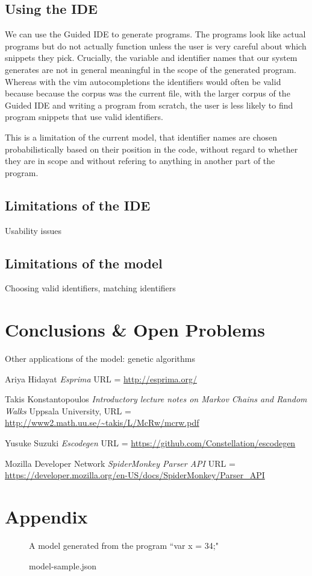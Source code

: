 \documentclass{article}
\begin{document}
\subsection{Using the IDE}

We can use the Guided IDE to generate programs. The programs look like actual
programs but do not actually function unless the user is very careful about
which snippets they pick. Crucially, the variable and identifier names that our
system generates are not in general meaningful in the scope of the generated
program.  Whereas with the vim autocompletions the identifiers would often be
valid because because the corpus was the current file, with the larger corpus of
the Guided IDE and writing a program from scratch, the user is less likely to
find program snippets that use valid identifiers.

This is a limitation of the current model, that identifier names are chosen
probabilistically based on their position in the code, without regard to whether
they are in scope and without refering to anything in another part of the
program.

\subsection{Limitations of the IDE}

Usability issues

\subsection{Limitations of the model}

Choosing valid identifiers, matching identifiers

\section{Conclusions \& Open Problems}

Other applications of the model: genetic algorithms

\clearpage
\begin{thebibliography}{1}

	 Ariya Hidayat {\em Esprima}
		URL = \url{http://esprima.org/}

	 Takis Konstantopoulos {\em Introductory lecture notes on
		Markov Chains and Random Walks} Uppsala University,
		URL = \url{http://www2.math.uu.se/~takis/L/McRw/mcrw.pdf}

	 Yusuke Suzuki {\em Escodegen}
		URL = \url{https://github.com/Constellation/escodegen}

	 Mozilla Developer Network {\em SpiderMonkey Parser API}
		URL = \url{https://developer.mozilla.org/en-US/docs/SpiderMonkey/Parser_API}

\end{thebibliography}

\clearpage
\section*{Appendix}

\begin{figure}[h!]
	\caption{model-sample.json}
	\label{fig:sample-model}
	\centering
	A model generated from the program ``var x = 34;"
\end{figure}


\end{document}
